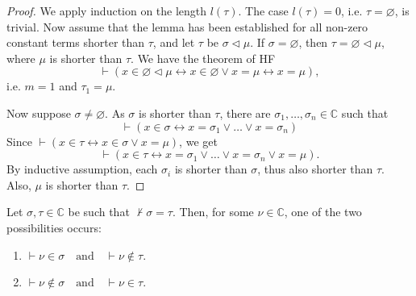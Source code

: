 \begin{proof}
    \leanok
    We apply induction on the length $l(\tau)$.
    The case $l(\tau) = 0$, i.e. $\tau = \varnothing$, is trivial.
    Now assume that the lemma has been established for all non-zero constant terms shorter 
    than $\tau$, and let $\tau$ be $\sigma \lhd \mu$.
    If $\sigma = \varnothing$, then $\tau = \varnothing \lhd \mu$, 
    where $\mu$ is shorter than $\tau$.
    We have the theorem of HF
    $$
    \vdash (x \in \varnothing \lhd \mu \leftrightarrow x \in \varnothing \lor x=\mu
    \leftrightarrow x=\mu),
    $$
    i.e. $m=1$ and $\tau_1 = \mu$. 
   
    Now suppose $\sigma \neq \varnothing$. As $\sigma$ is shorter than $\tau$,
    there are $\sigma_1, \ldots, \sigma_n \in \mathbb{C}$ such that
    $$
    \vdash (x \in \sigma \leftrightarrow x=\sigma_1 \lor \ldots \lor x=\sigma_n)
    $$
    Since $\vdash (x \in \tau \leftrightarrow x \in \sigma \lor x=\mu)$, we get
    $$
    \vdash (x \in \tau \leftrightarrow x=\sigma_1 \lor \ldots \lor x=\sigma_n \lor x=\mu).
    $$
    By inductive assumption, 
    each $\sigma_i$ is shorter than $\sigma$, thus also shorter than $\tau$. 
    Also, $\mu$ is shorter than $\tau$.
\end{proof}

\begin{lemma}
    \label{lem:C.exists_mem_and_notin_of_not_eq}
    \leanok
    Let $\sigma, \tau \in \mathbb{C}$ be such that $\not\vdash \sigma = \tau$. 
    Then, for some $\nu \in \mathbb{C}$, one of the two possibilities occurs:
    \begin{enumerate}
        \item $\vdash \nu \in \sigma \quad \text{and} \quad \vdash \nu \notin \tau$.
        \item $\vdash \nu \notin \sigma \quad \text{and} \quad \vdash \nu \in \tau$.
    \end{enumerate}
\end{lemma}

